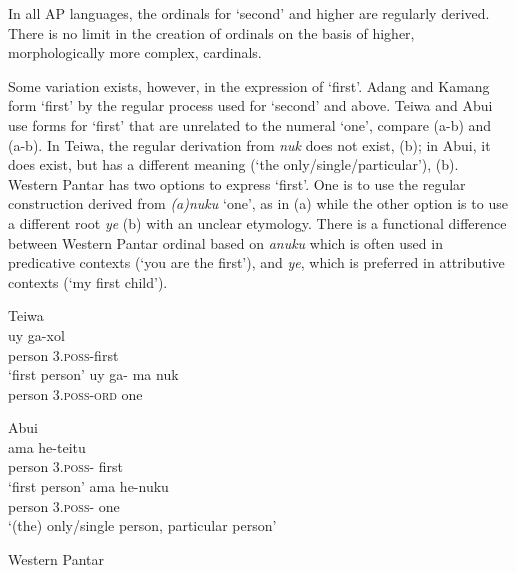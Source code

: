 In all AP languages, the ordinals for `second' and higher are regularly derived. There is no limit in the creation of ordinals on the basis of higher, morphologically more complex, cardinals.

Some variation exists, however, in the expression of `first'. Adang and Kamang form `first' by the regular process used for `second' and above. Teiwa and Abui use forms for `first' that are unrelated to the numeral `one', compare  (a-b) and  (a-b). In Teiwa, the regular derivation from \textit{nuk} does not exist, (b); in Abui, it does exist, but has a different meaning (`the only/single/particular'), (b). Western Pantar has two options to express `first'. One is to use the regular construction derived from \textit{(a)nuku} `one', as in (a) while the other option is to use a different root \textit{ye} (b) with an unclear etymology. There is a functional difference between Western Pantar ordinal based on \textit{anuku} which is often used in predicative contexts (`you are the first'), and \textit{ye}, which is preferred in attributive contexts (`my first child'). 


\ea%
\label{bkm:Ref342651040}
{\upshape Teiwa}\\
\ea
\gll  uy    ga-xol \\  
     person    3\textsc{.poss}-first\\
\glt`first person'
\ex
\gll *uy    ga- ma    nuk\\
person    3\textsc{.poss-ord } one\\ 
\z\z
 


\ea%
\label{bkm:Ref342651068}
{\upshape Abui}\\
\ea
\gll ama     he-teitu\\  
    person    3\textsc{.poss-}  first  \\
\glt`first person'
\ex
\gll ama     he-nuku\\  
  person    3\textsc{.poss- } one  \\
\glt `(the) only/single person,  particular person'
\z\z

 


\ea%
\label{bkm:Ref342651067}
{\upshape Western Pantar}\\
 
